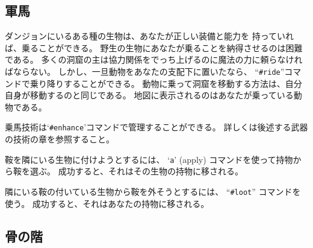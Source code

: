 \subsection*{軍馬}

ダンジョンにいるある種の生物は、あなたが正しい装備と能力を
持っていれば、乗ることができる。
野生の生物にあなたが乗ることを納得させるのは困難である。
多くの洞窟の主は協力関係をでっち上げるのに魔法の力に頼らなければならない。
しかし、一旦動物をあなたの支配下に置いたなら、
``{\tt \#ride}''コマンドで乗り降りすることができる。
動物に乗って洞窟を移動する方法は、自分自身が移動するのと同じである。
地図に表示されるのはあなたが乗っている動物である。

乗馬技術は`{\tt \#enhance}'コマンドで管理することができる。
詳しくは後述する武器の技術の章を参照すること。

鞍を隣にいる生物に付けようとするには、
`{\tt a}' (apply) コマンドを使って持物から鞍を選ぶ。
成功すると、それはその生物の持物に移される。

隣にいる鞍の付いている生物から鞍を外そうとするには、
``{\tt \#loot}'' コマンドを使う。
成功すると、それはあなたの持物に移される。

\subsection*{骨の階}


